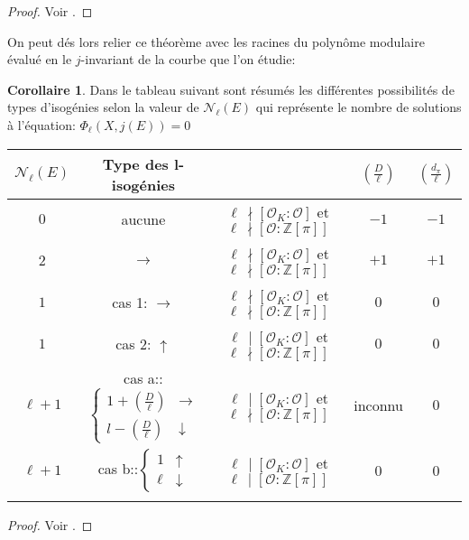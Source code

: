 \documentclass[10pt,a4paper]{book}
\theoremstyle{plain}
\theoremstyle{definition}
\theoremstyle{definition}
\newtheorem{cor}[thm]{Corollaire}
\theoremstyle{definition}
\theoremstyle{definition}
\theoremstyle{remark}
\theoremstyle{remark}
\begin{document}
\begin{proof}
Voir \cite[Proposition 23]{Kohel96}.
\end{proof}

On peut dés lors relier ce théorème avec les racines du polynôme modulaire évalué en le $j$-invariant de la courbe que l'on étudie:

\begin{cor}
\label{cor:tab:vol} 
Dans le tableau suivant sont résumés les différentes possibilités de types d'isogénies selon la valeur de $\mathcal{N}_{\ell}(E)$ qui représente le nombre de solutions à l'équation: $\Phi_{\ell}(X,j(E))=0$
\newline
\begin{tabular}{|c|c|c|c|c|}
\hline 
$\mathcal{N}_{\ell}(E)$ & Type des l-isogénies &  & $\left(\frac{D}{\ell}\right)$ & $\left(\frac{d_{\pi}}{\ell}\right)$\tabularnewline
\hline 
\hline 
$0$ & aucune & $\ell \,\nmid[\mathcal{O}_{K}:\mathcal{O}]$ et $\ell \,\nmid[\mathcal{O}:\mathbb{Z}[\pi]]$  & $-1$ & $-1$\tabularnewline
\hline 
$2$ & $\rightarrow$ & $\ell \,\nmid[\mathcal{O}_{K}:\mathcal{O}]$ et $\ell \,\nmid[\mathcal{O}:\mathbb{Z}[\pi]]$  & $+1$ & $+1$\tabularnewline
\hline 
$1$ & cas 1: $\rightarrow$ & $\ell\,\nmid[\mathcal{O}_{K}:\mathcal{O}]$ et $\ell\,\nmid[\mathcal{O}:\mathbb{Z}[\pi]]$  & $0$ & $0$\tabularnewline
\hline 
$1$ & cas 2: $\uparrow$ & $\ell\,\mid[\mathcal{O}_{K}:\mathcal{O}]$ et $\ell\,\nmid[\mathcal{O}:\mathbb{Z}[\pi]]$  & $0$ & $0$\tabularnewline
\hline 
$\ell+1$ & cas a::$\left\{ \begin{array}{cc}
1+\left(\frac{D}{\ell}\right) & \rightarrow\\
l-\left(\frac{D}{\ell}\right) & \downarrow
\end{array}\right.$ & $\ell \,\mid[\mathcal{O}_{K}:\mathcal{O}]$ et $\ell \,\nmid[\mathcal{O}:\mathbb{Z}[\pi]]$  & inconnu & $0$\tabularnewline
\hline 
$\ell+1$ & cas b::$\left\{ \begin{array}{cc}
1 & \uparrow\\
\ell & \downarrow
\end{array}\right.$ & $\ell \,\mid[\mathcal{O}_{K}:\mathcal{O}]$ et $\ell \,\mid[\mathcal{O}:\mathbb{Z}[\pi]]$  & $0$ & $0$\tabularnewline
\hline  \label{tableau}
\end{tabular}
\end{cor}

\begin{proof}
Voir \cite[§2.3]{FouquetMorain02}.
\end{proof}
\end{document}
